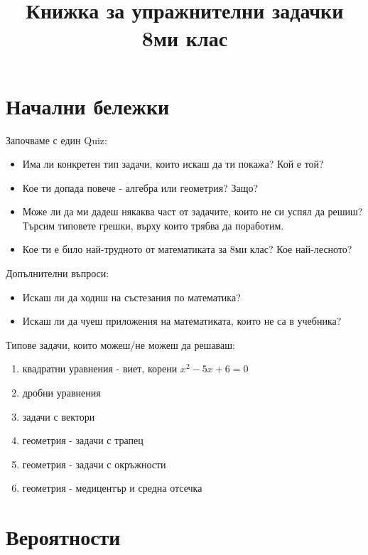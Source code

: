 \documentclass{article}
\date{}
\title{Книжка за упражнителни задачки 8ми клас}
\theoremstyle{plain}
\begin{document}
	
	
	\maketitle
	\tableofcontents
	
	\section{Начални бележки}
	Започваме с един Quiz:
	\begin{itemize}
		\item 	Има ли конкретен тип задачи, които искаш да ти покажа? Кой е той?
		\item Кое ти допада повече - алгебра или геометрия? Защо?
		\item Може ли да ми дадеш някаква част от задачите, които не си успял да решиш? Търсим типовете грешки, върху които трябва да поработим.
		\item Кое ти е било най-трудното от математиката за 8ми клас? Кое най-лесното?	

	\end{itemize}
	
	Допълнителни въпроси:
\begin{itemize}
	\item Искаш ли да ходиш на състезания по математика?
	\item Искаш ли да чуеш приложения на математиката, които не са в учебника?\\
	
\end{itemize}	
	
	Типове задачи, които можеш/не можеш да решаваш:
\begin{enumerate}
	\item квадратни уравнения - виет, корени $x^2 - 5x + 6 = 0 $
	\item дробни уравнения 
	\item задачи с вектори
	\item геометрия - задачи с трапец
	\item геометрия - задачи с окръжности
	\item геометрия - медицентър и средна отсечка
\end{enumerate}



\section{Вероятности}
	
\end{document}
